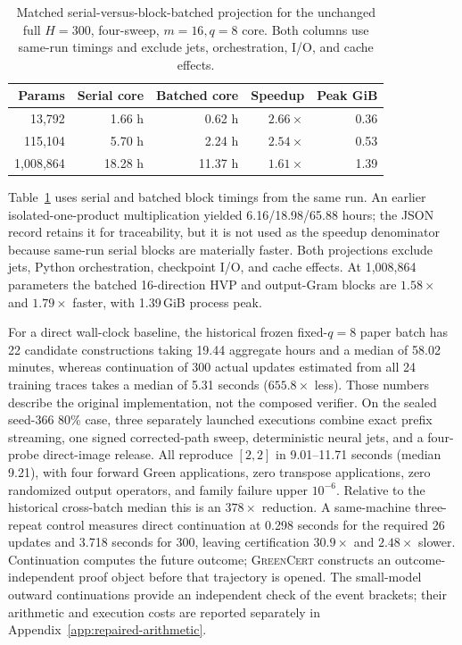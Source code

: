 \documentclass{article}
\newcommand{\method}{\textsc{GreenCert}}
\begin{document}
\begin{table}[H]
\caption{Matched serial-versus-block-batched projection for the unchanged full
$H=300$, four-sweep, $m=16,q=8$ core.  Both columns use same-run timings and
exclude jets, orchestration, I/O, and cache effects.}
\label{tab:scale}
\centering
\small
\setlength{\tabcolsep}{5.0pt}
\begin{tabular}{rrrrr}
\toprule
Params & Serial core & Batched core & Speedup & Peak GiB \\
\midrule
13,792    & 1.66 h & 0.62 h & $2.66\times$ & 0.36 \\
115,104   & 5.70 h & 2.24 h & $2.54\times$ & 0.53 \\
1,008,864 & 18.28 h & 11.37 h & $1.61\times$ & 1.39 \\
\bottomrule
\end{tabular}
\end{table}

Table~\ref{tab:scale} uses serial and batched block timings from the same run.
An earlier isolated-one-product multiplication yielded 6.16/18.98/65.88 hours;
the JSON record retains it for traceability, but it is not used as the speedup
denominator because same-run serial blocks are materially faster.  Both
projections exclude jets, Python orchestration, checkpoint I/O, and cache
effects.  At 1,008,864 parameters the batched 16-direction HVP and output-Gram
blocks are $1.58\times$ and $1.79\times$ faster, with 1.39\,GiB process peak.

For a direct wall-clock baseline, the historical frozen fixed-$q=8$ paper
batch has 22 candidate constructions taking 19.44 aggregate hours and a median
of 58.02 minutes, whereas continuation of 300 actual updates estimated from all
24 training traces takes a median of 5.31 seconds ($655.8\times$ less).  Those
numbers describe the original implementation, not the composed verifier.
On the sealed seed-366 80\% case, three separately launched executions combine
exact prefix streaming, one signed corrected-path sweep, deterministic neural
jets, and a four-probe direct-image release.  All reproduce $[2,2]$ in
9.01--11.71 seconds (median 9.21), with four forward Green applications, zero
transpose applications, zero randomized output operators, and family failure
upper $10^{-6}$.  Relative to the historical cross-batch median this is an
$378\times$ reduction.  A same-machine three-repeat control measures direct
continuation at 0.298 seconds for the required 26 updates and 3.718 seconds for
300, leaving certification $30.9\times$ and $2.48\times$ slower.  Continuation
computes the future outcome; \method{} constructs an outcome-independent proof object
before that trajectory is opened.  The small-model outward continuations
provide an independent check of the event brackets; their arithmetic and
execution costs are reported separately in Appendix~\ref{app:repaired-arithmetic}.
\end{document}

